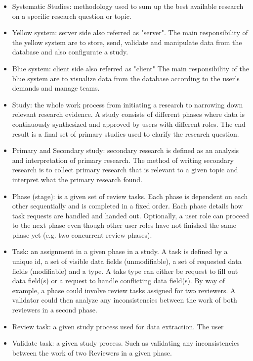 	\begin{itemize}
	  \item Systematic Studies: methodology used to sum up the best available research on a specific research question or topic.  
	  \item Yellow system: server side also referred as "server". The main responsibility of the yellow system are to store, send, validate and manipulate data from the database and also configurate a study.
	  \item Blue system: client side also referred as "client" The main responsibility of the blue system are to visualize data from the database according to the user's demands and manage teams.
	  \item Study: the whole work process from initiating a research to narrowing down relevant research evidence. A study consists of different phases where data is continuously synthesized and approved by users with different roles. The end result is a final set of primary studies used to clarify the research question. 
	  \item Primary and Secondary study: secondary research is defined as an analysis and interpretation of primary research. The method of writing secondary research is to collect primary research that is relevant to a given topic and interpret what the primary research found.
	  \item Phase (stage): is a given set of review tasks. Each phase is dependent on each other sequentially and is completed in a fixed order. Each phase details how task requests are handled and handed out. Optionally, a user role can proceed to the next phase even though other user roles have not finished the same phase yet (e.g. two concurrent review phases).
	  \item Task: an assignment in a given phase in a study. A task is defined by a unique id, a set of visible data fields (unmodifiable), a set of requested data fields (modifiable) and a type. A taks type can either be  request to fill out data field(s) or a request to handle conflicting data field(s). By way of example, a phase could involve review tasks assigned for two reviewers. A validator could then analyze any inconsistencies between the work of both reviewers in a second phase.
	  \item Review task: a given study process used for data extraction. The user 
	  \item Validate task: a given study process. Such as validating any inconsistencies between the work of two Reviewers in a given phase. 

\end{itemize}
